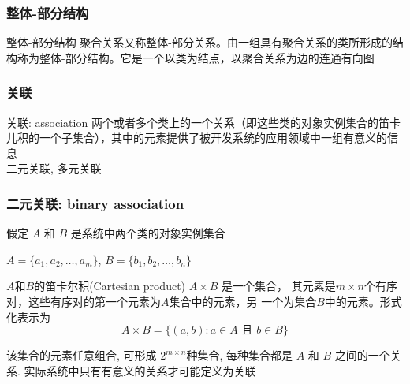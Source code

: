 \documentclass[compress]{beamer}
\begin{document}
\begin{frame}
\frametitle{整体-部分结构}
\begin{block}{ 整体-部分结构}
聚合关系又称整体-部分关系。由一组具有聚合关系的类所形成的结构称为整体-部分结构。它是一个以类为结点，以聚合关系为边的连通有向图
\end{block}

\vspace*{2ex}
\end{frame}

\begin{frame}
\frametitle{关联}
\begin{block}{关联: association}
两个或者多个类上的一个关系（即这些类的对象实例集合的笛卡儿积的一个子集合），其中的元素提供了被开发系统的应用领域中一组有意义的信息  \\
二元关联, 多元关联
\end{block}

\vspace*{2ex}

\end{frame}

\begin{frame}
\frametitle{二元关联: binary association}
假定 $A$ 和 $B$ 是系统中两个类的对象实例集合

$ A = \{a_1, a_2, \mbox{\ldots}, a_m\} $, 
$ B = \{b_1, b_2, \mbox{\ldots}, b_n\} $

$A$和$B$的笛卡尔积(Cartesian product) $A\times B$ 是一个集合，
其元素是$m \times n$个有序对，这些有序对的第一个元素为$A$集合中的元素，另
一个为集合$B$中的元素。形式化表示为
\[A\times B=\{(a,b):a\in A\mbox{~且~}b\in B\}\]

该集合的元素任意组合, 可形成 $2^{m \times n}$种集合, 每种集合都是 $A$ 和 $B$ 之间的一个关系. 实际系统中只有有意义的关系才可能定义为关联

\end{frame}
\end{document}
